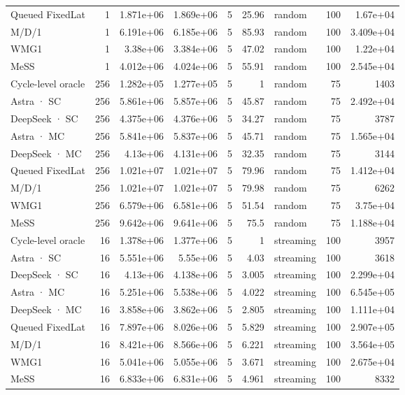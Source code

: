 \begin{tabular}{lrrrrrlrr}
Queued FixedLat & 1 & 1.871e+06 & 1.869e+06 & 5 & 25.96 & random & 100 & 1.67e+04 \\
M/D/1 & 1 & 6.191e+06 & 6.185e+06 & 5 & 85.93 & random & 100 & 3.409e+04 \\
WMG1 & 1 & 3.38e+06 & 3.384e+06 & 5 & 47.02 & random & 100 & 1.22e+04 \\
MeSS & 1 & 4.012e+06 & 4.024e+06 & 5 & 55.91 & random & 100 & 2.545e+04 \\
Cycle-level oracle & 256 & 1.282e+05 & 1.277e+05 & 5 & 1 & random & 75 & 1403 \\
Astra · SC & 256 & 5.861e+06 & 5.857e+06 & 5 & 45.87 & random & 75 & 2.492e+04 \\
DeepSeek · SC & 256 & 4.375e+06 & 4.376e+06 & 5 & 34.27 & random & 75 & 3787 \\
Astra · MC & 256 & 5.841e+06 & 5.837e+06 & 5 & 45.71 & random & 75 & 1.565e+04 \\
DeepSeek · MC & 256 & 4.13e+06 & 4.131e+06 & 5 & 32.35 & random & 75 & 3144 \\
Queued FixedLat & 256 & 1.021e+07 & 1.021e+07 & 5 & 79.96 & random & 75 & 1.412e+04 \\
M/D/1 & 256 & 1.021e+07 & 1.021e+07 & 5 & 79.98 & random & 75 & 6262 \\
WMG1 & 256 & 6.579e+06 & 6.581e+06 & 5 & 51.54 & random & 75 & 3.75e+04 \\
MeSS & 256 & 9.642e+06 & 9.641e+06 & 5 & 75.5 & random & 75 & 1.188e+04 \\
Cycle-level oracle & 16 & 1.378e+06 & 1.377e+06 & 5 & 1 & streaming & 100 & 3957 \\
Astra · SC & 16 & 5.551e+06 & 5.55e+06 & 5 & 4.03 & streaming & 100 & 3618 \\
DeepSeek · SC & 16 & 4.13e+06 & 4.138e+06 & 5 & 3.005 & streaming & 100 & 2.299e+04 \\
Astra · MC & 16 & 5.251e+06 & 5.538e+06 & 5 & 4.022 & streaming & 100 & 6.545e+05 \\
DeepSeek · MC & 16 & 3.858e+06 & 3.862e+06 & 5 & 2.805 & streaming & 100 & 1.111e+04 \\
Queued FixedLat & 16 & 7.897e+06 & 8.026e+06 & 5 & 5.829 & streaming & 100 & 2.907e+05 \\
M/D/1 & 16 & 8.421e+06 & 8.566e+06 & 5 & 6.221 & streaming & 100 & 3.564e+05 \\
WMG1 & 16 & 5.041e+06 & 5.055e+06 & 5 & 3.671 & streaming & 100 & 2.675e+04 \\
MeSS & 16 & 6.833e+06 & 6.831e+06 & 5 & 4.961 & streaming & 100 & 8332 \\

\end{tabular}
